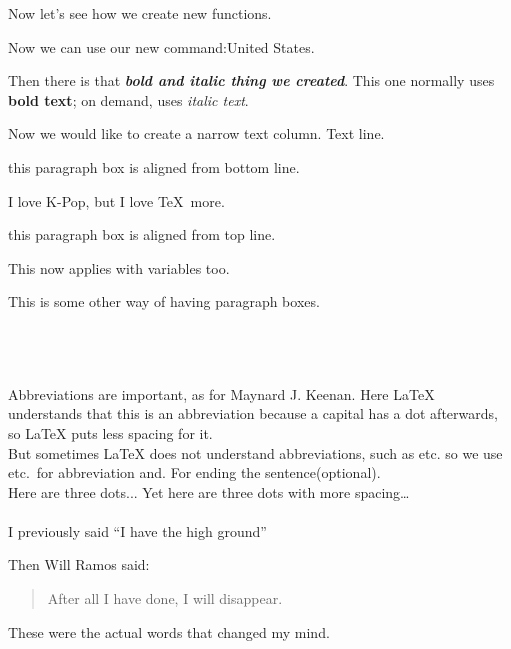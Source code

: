 \documentclass[a4paper, 11pt]{article}
\begin{document}
    \noindent Now let's see how we create new functions.
    \newcommand{\US}{United States}
    \newcommand{\bi}[1]{\textbf{\textit{#1}}}   %
    \newcommand{\bio}[2][\bfseries]{{#1#2}}     %

    Now we can use our new command:\US.

    Then there is that \bi{bold and italic thing we created}.
    This one normally uses \bio{bold text}; on demand, uses \bio[\itshape]{italic text}.

    Now we would like to create a narrow text column. %
    Text line.  %
    \quad \parbox[b]{3cm}{this paragraph box is aligned from bottom line.}
    \quad \parbox{3cm}{I love K-Pop, but I love \TeX\ more.}            %
    \quad \parbox[t]{3cm}{this paragraph box is aligned from top line.} %

    This now applies with variables too.
    \begin{minipage}[t]{3cm}
        This is some other way of having paragraph boxes.
    \end{minipage}
    \\
    \\
    \\
    Abbreviations are important, as for Maynard J. Keenan.
    Here LaTeX understands that this is an abbreviation because a capital has a dot afterwards, so LaTeX puts less spacing for it. \\
    But sometimes LaTeX does not understand abbreviations, such as etc. so we use etc.\ for abbreviation and\@. For ending the sentence(optional). \\
    Here are three dots... Yet here are three dots with more spacing\ldots
    \\
    \\
    I previously said ``I have the high ground''

    \noindent Then Will Ramos said:
    \begin{quote}
        After all I have done, I will disappear.
    \end{quote}
    These were the actual words that changed my mind.
\end{document}
